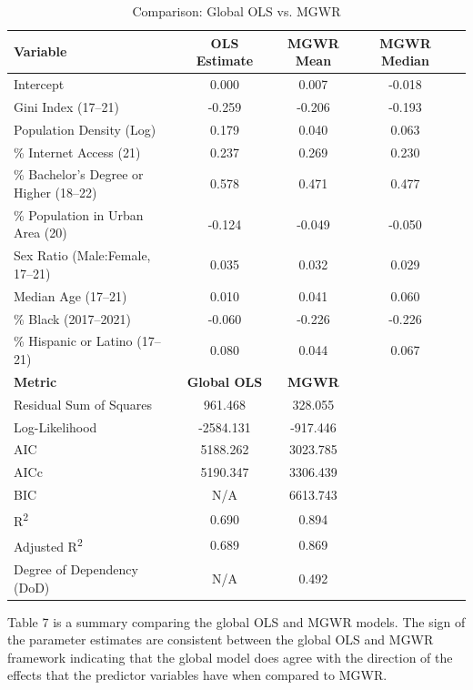\documentclass[
]{article}
\begin{document}
\begin{table}[H]
\renewcommand{\arraystretch}{1.3}
\centering
\caption{Comparison: Global OLS vs. MGWR}
\label{tab:ols_vs_mgwr}
\begin{tabular}{lcccc}
\hline
\textbf{Variable} & \textbf{OLS Estimate} & \textbf{MGWR Mean} & \textbf{MGWR Median} \\ \hline
Intercept                & 0.000 & 0.007 & -0.018 \\ 
Gini Index (17–21)       & -0.259 & -0.206 & -0.193 \\ 
Population Density (Log) & 0.179 & 0.040 & 0.063 \\ 
\% Internet Access (21)  & 0.237 & 0.269 & 0.230 \\ 
\% Bachelor's Degree or Higher (18–22) & 0.578 & 0.471 & 0.477 \\ 
\% Population in Urban Area (20) & -0.124 & -0.049 & -0.050 \\ 
Sex Ratio (Male:Female, 17–21) & 0.035 & 0.032 & 0.029 \\ 
Median Age (17–21)       & 0.010 & 0.041 & 0.060 \\ 
\% Black (2017–2021)     & -0.060 & -0.226 & -0.226 \\ 
\% Hispanic or Latino (17–21) & 0.080 & 0.044 & 0.067 \\ \hline
\textbf{Metric} & \textbf{Global OLS} & \textbf{MGWR} \\ \hline
Residual Sum of Squares  & 961.468 & 328.055 \\
Log-Likelihood           & -2584.131 & -917.446 \\
AIC                      & 5188.262 & 3023.785 \\
AICc                     & 5190.347 & 3306.439 \\
BIC                      & N/A & 6613.743 \\
R\textsuperscript{2}     & 0.690 & 0.894 \\
Adjusted R\textsuperscript{2} & 0.689 & 0.869 \\
Degree of Dependency (DoD) & N/A & 0.492 \\ \hline
\end{tabular}
\end{table}

Table 7 is a summary comparing the global OLS and MGWR models. The sign
of the parameter estimates are consistent between the global OLS and
MGWR framework indicating that the global model does agree with the
direction of the effects that the predictor variables have when compared
to MGWR.
\end{document}
